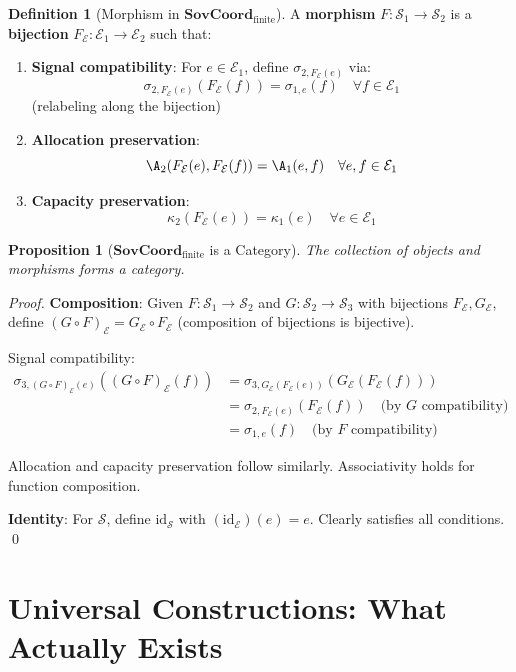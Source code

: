 \documentclass[11pt,a4paper]{article}
\newtheorem{proposition}[theorem]{Proposition}
\theoremstyle{definition}
\newtheorem{definition}[theorem]{Definition}
\theoremstyle{remark}
\newcommand{\E}{\mathcal{E}}
\newcommand{\SovCoord}{\mathbf{SovCoord}}
\begin{document}
\begin{definition}[Morphism in $\SovCoord_{\text{finite}}$]
A \textbf{morphism} $F: \mathcal{S}_1 \to \mathcal{S}_2$ is a \textbf{bijection} $F_\E: \E_1 \to \E_2$ such that:

\begin{enumerate}
\item \textbf{Signal compatibility}: For $e \in \E_1$, define $\sigma_{2,F_\E(e)}$ via:
   \[ \sigma_{2,F_\E(e)}(F_\E(f)) = \sigma_{1,e}(f) \quad \forall f \in \E_1 \]
   (relabeling along the bijection)

\item \textbf{Allocation preservation}: 
   \[ \A_2(F_\E(e), F_\E(f)) = \A_1(e, f) \quad \forall e,f \in \E_1 \]

\item \textbf{Capacity preservation}: 
   \[ \kappa_2(F_\E(e)) = \kappa_1(e) \quad \forall e \in \E_1 \]
\end{enumerate}
\end{definition}

\begin{proposition}[$\SovCoord_{\text{finite}}$ is a Category]
\label{prop:category}
The collection of objects and morphisms forms a category.
\end{proposition}

\begin{proof}
\textbf{Composition}: Given $F: \mathcal{S}_1 \to \mathcal{S}_2$ and $G: \mathcal{S}_2 \to \mathcal{S}_3$ with bijections $F_\E, G_\E$, define $(G \circ F)_\E = G_\E \circ F_\E$ (composition of bijections is bijective).

Signal compatibility:
\begin{align*}
\sigma_{3,(G \circ F)_\E(e)}((G \circ F)_\E(f)) 
&= \sigma_{3,G_\E(F_\E(e))}(G_\E(F_\E(f))) \\
&= \sigma_{2,F_\E(e)}(F_\E(f)) \quad \text{(by $G$ compatibility)} \\
&= \sigma_{1,e}(f) \quad \text{(by $F$ compatibility)}
\end{align*}

Allocation and capacity preservation follow similarly. Associativity holds for function composition.

\textbf{Identity}: For $\mathcal{S}$, define $\text{id}_{\mathcal{S}}$ with $(\text{id}_\E)(e) = e$. Clearly satisfies all conditions. \qed
\end{proof}

\section{Universal Constructions: What Actually Exists}
\end{document}

